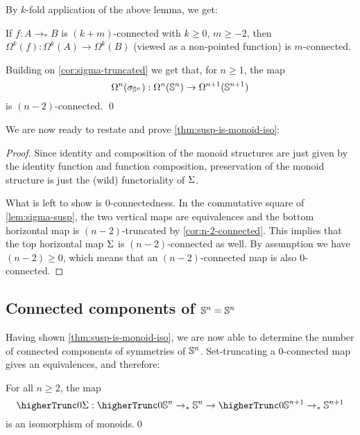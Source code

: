 \documentclass[english,a4paper]{lmcs}
\begin{document}
By $k$-fold application of the above lemma, we get:
\begin{cor} \label{cor:n-2-connected}
    If $f : A \to_* B$ is $(k+m)$-connected with $k \geq 0$, $m \geq -2$, then
    $\Omega^k(f) : \Omega^k(A) \to \Omega^k(B)$ (viewed as a non-pointed function) is $m$-connected.

    Building on \cref{cor:sigma-truncated} we get that, for $n \geq 1$, the map
    \begin{equation}
      \mathop{\Omega^{n}} (\sigma_{{\mathbb S^{n}}}) : \Omega^n({\mathbb S^{n}}) \to \Omega^{n+1}({\mathbb S^{n+1}})
    \end{equation}
    is $(n-2)$-connected.
    \qed
\end{cor}

We are now ready to restate and prove \cref{thm:susp-is-monoid-iso}:

\suspiso*
\begin{proof}
    Since identity and composition of the monoid structures are just given by the identity function and function composition,
    preservation of the monoid structure is just the (wild) functoriality of $\operatorname{\Sigma}$.

    What is left to show is $0$-connectedness.
    In the commutative square of \cref{lem:sigma-susp}, the two vertical maps are equivalences and the bottom horizontal map is $(n-2)$-truncated by \cref{cor:n-2-connected}.
    This implies that the top horizontal map $\operatorname{\Sigma}$ is $(n-2)$-connected as well.
    By assumption we have $(n-2) \geq 0$, which means that an $(n-2)$-connected map is also $0$-connected.
\end{proof}

\subsection{Connected components of
  \texorpdfstring{${\mathbb S^{n}} = {\mathbb S^{n}}$}{Sn = Sn}}

Having shown \cref{thm:susp-is-monoid-iso}, we are now able to determine the number of connected components of symmetries of ${\mathbb S^{n}}$.
Set-truncating a $0$-connected map gives an equivalences, and therefore:
\begin{cor} \label{cor:iso-of-monoids}
    For all $n \geq 2$, the map
    \begin{equation}
    \higherTrunc 0 {\susp} : \higherTrunc 0 {\Sn n \to_* \Sn n} \to \higherTrunc 0 {\Sn {n+1} \to_* \Sn {n+1}}
    \end{equation}
    is an isomorphism of monoids.\qed
\end{cor}
\end{document}
